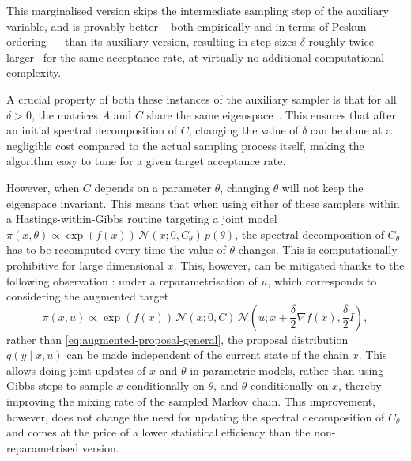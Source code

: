 This marginalised version skips the intermediate sampling step of the auxiliary variable, and is provably better -- both empirically and in terms of Peskun ordering~\citep{peskun1973optimum,tierney1998note,leisen2008extension} -- than its auxiliary version, resulting in step sizes $\delta$ roughly twice larger~\citep[see Tables 1, 2, and 3 in][]{titsias2018} for the same acceptance rate, at virtually no additional computational complexity.

A crucial property of both these instances of the auxiliary sampler is that for all $\delta > 0$, %
the matrices $A$ and $C$ share the same eigenspace~\citep[Section 3.3]{titsias2018}. This ensures that after an initial spectral decomposition of $C$, changing the value of $\delta$ can be done at a negligible cost compared to the actual sampling process itself, making the algorithm easy to tune for a given target acceptance rate.

However, when $C$ depends on a parameter $\theta$, changing $\theta$ will not keep the eigenspace invariant. This means that when using either of these samplers within a Hastings-within-Gibbs routine targeting a joint model $\pi(x, \theta) \propto \exp(f(x))\,\mathcal{N}(x; 0, C_{\theta}) \, p(\theta)$, the spectral decomposition of $C_{\theta}$ has to be recomputed every time the value of $\theta$ changes. This is computationally prohibitive for large dimensional $x$. This, however, can be mitigated thanks to the following observation \citep{titsias2018}: under a reparametrisation of $u$, which corresponds to considering the augmented target
\begin{equation}
    \label{eq:augmented-proposal-z-form}
    \pi(x, u) \propto \exp(f(x))\,\mathcal{N}(x; 0, C)\, \mathcal{N}\left(u; x + \frac{\delta}{2} \nabla f(x), \frac{\delta}{2} I\right),
\end{equation}
rather than \eqref{eq:augmented-proposal-general},
the proposal distribution $q(y \mid x, u)$ can be made independent of the current state of the chain $x$. This allows doing joint updates of $x$ and $\theta$ in parametric models, rather than using Gibbs steps to sample $x$ conditionally on $\theta$, and $\theta$ conditionally on $x$, thereby improving the mixing rate of the sampled Markov chain. This improvement, however, does not change the need for updating the spectral decomposition of $C_{\theta}$ and comes at the price of a lower statistical efficiency than the non-reparametrised version. 